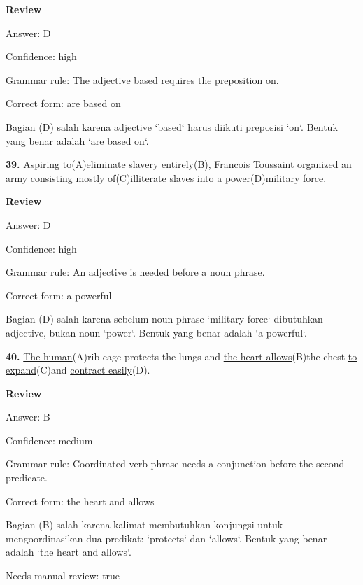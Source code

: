 \documentclass[12pt]{article}
\begin{document}
\par
\begingroup
\setlength{\parskip}{0pt}
\setlength{\parindent}{0pt}
\textbf{Review}\par
Answer: D\par
Confidence: high\par
Grammar rule: The adjective based requires the preposition on.\par
Correct form: are based on\par
Bagian (D) salah karena adjective `based` harus diikuti preposisi `on`. Bentuk yang benar adalah `are based on`.\par
\endgroup
\par
\vspace{\questionblockgap}
\noindent\textbf{39.} \uline{Aspiring to}(A)eliminate slavery \uline{entirely}(B), Francois Toussaint organized an army \uline{consisting mostly of}(C)illiterate slaves into \uline{a power}(D)military force.
\par
\begingroup
\setlength{\parskip}{0pt}
\setlength{\parindent}{0pt}
\textbf{Review}\par
Answer: D\par
Confidence: high\par
Grammar rule: An adjective is needed before a noun phrase.\par
Correct form: a powerful\par
Bagian (D) salah karena sebelum noun phrase `military force` dibutuhkan adjective, bukan noun `power`. Bentuk yang benar adalah `a powerful`.\par
\endgroup
\par
\vspace{\questionblockgap}
\noindent\textbf{40.} \uline{The human}(A)rib cage protects the lungs and \uline{the heart allows}(B)the chest \uline{to expand}(C)and \uline{contract easily}(D).
\par
\begingroup
\setlength{\parskip}{0pt}
\setlength{\parindent}{0pt}
\textbf{Review}\par
Answer: B\par
Confidence: medium\par
Grammar rule: Coordinated verb phrase needs a conjunction before the second predicate.\par
Correct form: the heart and allows\par
Bagian (B) salah karena kalimat membutuhkan konjungsi untuk mengoordinasikan dua predikat: `protects` dan `allows`. Bentuk yang benar adalah `the heart and allows`.\par
Needs manual review: true\par
\endgroup
\par
\vspace{\questionblockgap}
\end{document}
